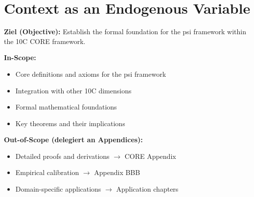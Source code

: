 %
%
%
%

\chapter{Context as an Endogenous Variable}
\label{ch:context}

\begin{tcolorbox}[
    colback=purple!5!white,
    colframe=purple!75!black,
    title={\textbf{Chapter Scope: Ziel / In-Scope / Out-of-Scope}},
    fonttitle=\bfseries
]

\textbf{Ziel (Objective):}
Establish the formal foundation for the psi framework within the 10C CORE framework.

\vspace{0.3cm}
\textbf{In-Scope:}
\begin{itemize}[nosep]
    \item Core definitions and axioms for the psi framework
    \item Integration with other 10C dimensions
    \item Formal mathematical foundations
    \item Key theorems and their implications
\end{itemize}

\vspace{0.3cm}
\textbf{Out-of-Scope (delegiert an Appendices):}
\begin{itemize}[nosep]
    \item Detailed proofs and derivations $\rightarrow$ CORE Appendix
    \item Empirical calibration $\rightarrow$ Appendix BBB
    \item Domain-specific applications $\rightarrow$ Application chapters
\end{itemize}

\end{tcolorbox}



